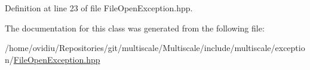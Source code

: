 \-Definition at line 23 of file \-File\-Open\-Exception.\-hpp.



\-The documentation for this class was generated from the following file\-:\begin{DoxyCompactItemize}
\item 
/home/ovidiu/\-Repositories/git/multiscale/\-Multiscale/include/multiscale/exception/\hyperlink{FileOpenException_8hpp}{\-File\-Open\-Exception.\-hpp}\end{DoxyCompactItemize}
